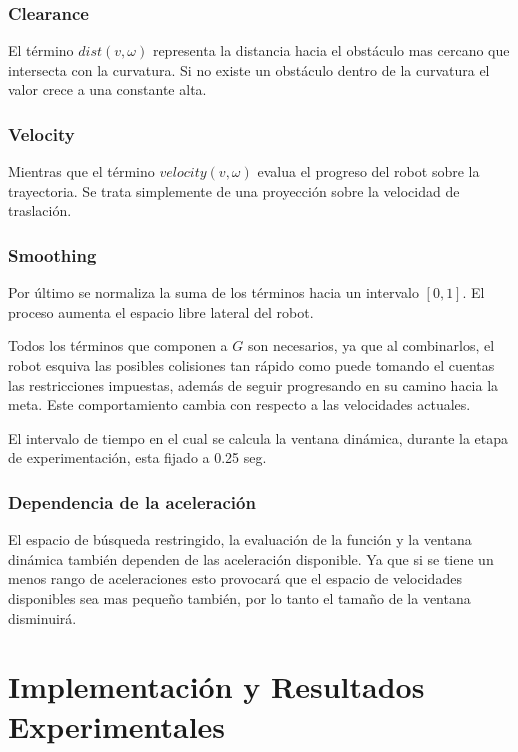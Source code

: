 \documentclass[10pt]{article}
\begin{document}
\subsubsection*{Clearance}
El término $dist(v, \omega)$ representa la distancia hacia el obstáculo mas cercano que intersecta con la curvatura. Si no existe un obstáculo dentro de la curvatura el valor crece a una constante alta.

\subsubsection*{Velocity}
Mientras que el término $velocity(v, \omega)$ evalua el progreso del robot sobre la trayectoria. Se trata simplemente de una proyección sobre la velocidad de traslación.

\subsubsection*{Smoothing}
Por último se normaliza la suma de los términos hacia un intervalo $[0,  1]$. El proceso aumenta el espacio libre lateral del robot.

Todos los términos que componen a $G$ son necesarios, ya que al combinarlos, el robot esquiva las posibles colisiones tan rápido como puede tomando el cuentas las restricciones impuestas, además de seguir progresando en su camino hacia la meta. Este comportamiento cambia con respecto a las velocidades actuales. 

El intervalo de tiempo en el cual se calcula la ventana dinámica, durante la etapa de experimentación, esta fijado a 0.25 seg.

\subsubsection*{Dependencia de la aceleración}
El espacio de búsqueda restringido, la evaluación de la función y la ventana dinámica también dependen de las aceleración disponible. Ya que si se tiene un menos rango de aceleraciones esto provocará que el espacio de velocidades disponibles sea mas pequeño también, por lo tanto el tamaño de la ventana disminuirá.






\section{Implementación y Resultados Experimentales}
\end{document}
